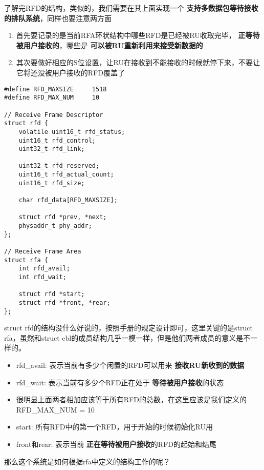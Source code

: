 \documentclass{article}
\newcommand{\highlight}[1]{{\bfseries \color{red}  #1}}
\begin{document}
\begin{CJK*}{UTF8}{gkai}
了解完RFD的结构，类似的，我们需要在其上面实现一个\highlight{支持多数据包等待接收的排队系统}，同样也要注意两方面
\begin{enumerate}
\item{首先要记录的是当前RFA环状结构中哪些RFD是已经被RU收取完毕，\highlight{正等待被用户接收的}，哪些是\highlight{可以被RU重新利用来接受新数据的}}
\item{其次要做好相应的S位设置，让RU在接收到不能接收的时候就停下来，不要让它将还没被用户接收的RFD覆盖了}
\end{enumerate}

\begin{lstlisting}[style=ccode, title={\scriptsize \ttfamily \bfseries kern/e100.h}]
#define RFD_MAXSIZE     1518
#define RFD_MAX_NUM     10

// Receive Frame Descriptor
struct rfd {
    volatile uint16_t rfd_status;
    uint16_t rfd_control;
    uint32_t rfd_link;

    uint32_t rfd_reserved;
    uint16_t rfd_actual_count;
    uint16_t rfd_size;

    char rfd_data[RFD_MAXSIZE];

    struct rfd *prev, *next;
    physaddr_t phy_addr;   
};

// Receive Frame Area
struct rfa {
    int rfd_avail;
    int rfd_wait;

    struct rfd *start;
    struct rfd *front, *rear;
};
\end{lstlisting}


struct rfd的结构没什么好说的，按照手册的规定设计即可，这里关键的是struct rfa，虽然和struct cbl的成员结构几乎一模一样，但是他们两者成员的意义是不一样的。

\begin{itemize}
\item{rfd\_avail: 表示当前有多少个闲置的RFD可以用来\highlight{接收RU新收到的数据}}
\item{rfd\_wait: 表示当前有多少个RFD正在处于\highlight{等待被用户接收}的状态}
\item{很明显上面两者相加应该等于所有RFD的总数，在这里应该是我们定义的RFD\_MAX\_NUM = 10}
\item{start: 所有RFD中的第一个RFD，用于开始的时候初始化RU用}
\item{front和rear: 表示当前\highlight{正在等待被用户接收}的RFD的起始和结尾}

\end{itemize}


那么这个系统是如何根据rfa中定义的结构工作的呢？


\end{CJK*}
\end{document}
